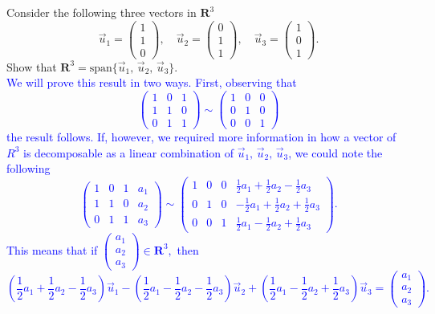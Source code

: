 \documentclass[a4paper,11pt]{article}
\newcommand{\R}{\mathbf{R}}
\newcommand{\BB}[1]{\textcolor{blue}{#1}}
\begin{document}
 Consider the following three vectors in $\R^3$
\[
  \vec u_1 = \begin{pmatrix}1\\1\\0\end{pmatrix},\quad
  \vec u_2 = \begin{pmatrix}0\\1\\1\end{pmatrix},\quad
  \vec u_3 = \begin{pmatrix}1\\0\\1\end{pmatrix}.
\]
Show that $\R^3=\text{span}\{\vec u_1,\,\vec u_2,\,\vec u_3\}$. \\

\BB{We will prove this result in two ways. First, observing that
  \[
    \left(
      \begin{array}{rrr}
        1 & 0 & 1 \\
        1 & 1 & 0 \\
        0 & 1 & 1
      \end{array}
    \right)
    \sim
    \left(
      \begin{array}{rrr}
        1 & 0 & 0 \\
        0 & 1 & 0 \\
        0 & 0 & 1
      \end{array}
    \right)
  \]
  the result follows. If, however, we required more information in how a vector
  of $R^3$ is decomposable as a linear combination of $\vec u_1,\,\vec u_2,\,\vec
  u_3$, we could note the following
  \[
    \left(
      \begin{array}{rrrr}
        1 & 0 & 1 & a_1 \\
        1 & 1 & 0 & a_2 \\
        0 & 1 & 1 & a_3
      \end{array}
    \right) 
    \sim
    \left(
      \begin{array}{rrrr}
        1 & 0 & 0 & \frac{1}{2}a_1+\frac{1}{2}a_2-\frac{1}{2}a_3 \\
        0 & 1 & 0 & -\frac{1}{2}a_1+\frac{1}{2}a_2+\frac{1}{2}a_3 \\
        0 & 0 & 1 & \frac{1}{2}a_1-\frac{1}{2}a_2+\frac{1}{2}a_3
      \end{array}
    \right).
  \]
  This means that if
  $
  \left(
    \begin{smallmatrix}
      a_1\\a_2\\a_3
    \end{smallmatrix}
  \right)
  \in \R^3,
  $
  then
  \[
    \left( \frac{1}{2}a_1+\frac{1}{2}a_2-\frac{1}{2}a_3 \right)\vec u_1-
    \left( \frac{1}{2}a_1-\frac{1}{2}a_2-\frac{1}{2}a_3 \right)\vec u_2+
    \left( \frac{1}{2}a_1-\frac{1}{2}a_2+\frac{1}{2}a_3 \right)\vec u_3=
    \begin{pmatrix}a_1\\a_2\\a_3\end{pmatrix}.
  \]
}
\end{document}
